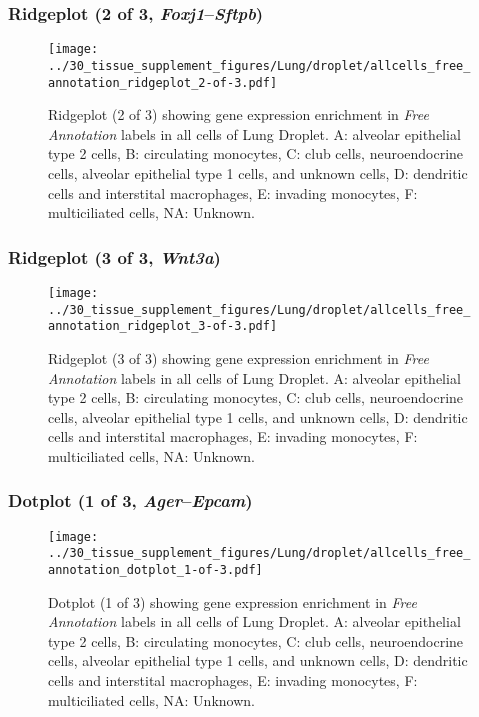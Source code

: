 \clearpage

\subsubsection{Ridgeplot (2 of 3, \emph{Foxj1}--\emph{Sftpb})}
\begin{figure}[h]
\centering
\texttt{[image: ../30\_tissue\_supplement\_figures/Lung/droplet/allcells\_free\_annotation\_ridgeplot\_2-of-3.pdf]}

\caption{ Ridgeplot (2 of 3)  showing gene expression enrichment in \emph{Free Annotation} labels in all cells of Lung Droplet. A: alveolar epithelial type 2 cells, B: circulating monocytes, C: club cells, neuroendocrine cells, alveolar epithelial type 1 cells, and unknown cells, D: dendritic cells and interstital macrophages, E: invading monocytes, F: multiciliated cells, NA: Unknown.}
\end{figure}


\clearpage

\subsubsection{Ridgeplot (3 of 3, \emph{Wnt3a})}
\begin{figure}[h]
\centering
\texttt{[image: ../30\_tissue\_supplement\_figures/Lung/droplet/allcells\_free\_annotation\_ridgeplot\_3-of-3.pdf]}

\caption{ Ridgeplot (3 of 3)  showing gene expression enrichment in \emph{Free Annotation} labels in all cells of Lung Droplet. A: alveolar epithelial type 2 cells, B: circulating monocytes, C: club cells, neuroendocrine cells, alveolar epithelial type 1 cells, and unknown cells, D: dendritic cells and interstital macrophages, E: invading monocytes, F: multiciliated cells, NA: Unknown.}
\end{figure}


\clearpage

\subsubsection{Dotplot (1 of 3, \emph{Ager}--\emph{Epcam})}
\begin{figure}[h]
\centering
\texttt{[image: ../30\_tissue\_supplement\_figures/Lung/droplet/allcells\_free\_annotation\_dotplot\_1-of-3.pdf]}

\caption{ Dotplot (1 of 3)  showing gene expression enrichment in \emph{Free Annotation} labels in all cells of Lung Droplet. A: alveolar epithelial type 2 cells, B: circulating monocytes, C: club cells, neuroendocrine cells, alveolar epithelial type 1 cells, and unknown cells, D: dendritic cells and interstital macrophages, E: invading monocytes, F: multiciliated cells, NA: Unknown.}
\end{figure}


